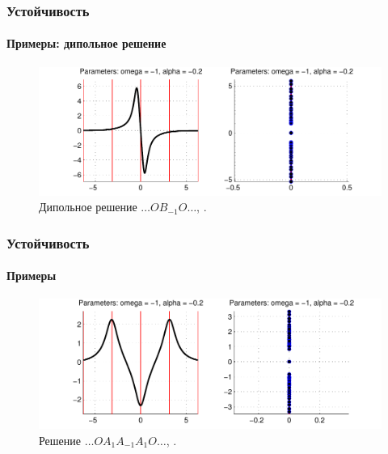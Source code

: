 \documentclass [10pt] {beamer}
\begin{document}
\begin{frame}
	\frametitle{Устойчивость}
	\framesubtitle{Примеры: дипольное решение\footnotemark[5]}
	
	\begin{figure}
		\includegraphics[width=1\textwidth]{pic/example_2.pdf}
		\caption{Дипольное решение $\dots O B_{-1} O \dots$, {\it \color{forestgreen}{линейно устойчиво}}.}
		\label{pic:example_2}
	\end{figure}
	
\end{frame}

\begin{frame}
	\frametitle{Устойчивость}
	\framesubtitle{Примеры}
	
	\begin{figure}
		\includegraphics[width=1\textwidth]{pic/example_3.pdf}
		\caption{Решение $\dots O A_1 A_{-1} A_1 O \dots$, {\it \color{forestgreen}{линейно устойчиво}}.}
		\label{pic:example_3}
	\end{figure}
\end{frame}
\end{document}
